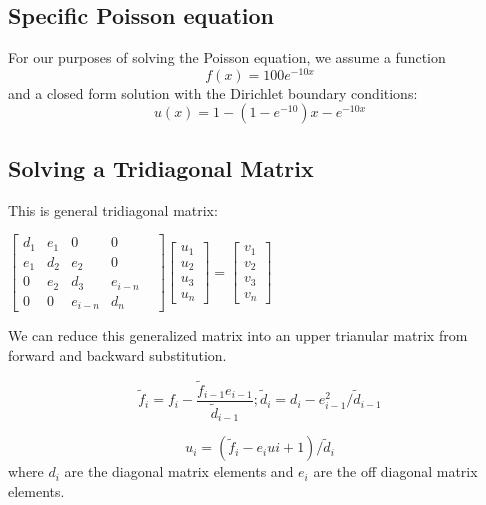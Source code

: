 \documentclass[10pt,showpacs,preprintnumbers,footinbib,amsmath,amssymb,aps,prl,twocolumn,groupedaddress,superscriptaddress,showkeys]{revtex4-1}
\begin{document}
	\subsection{Specific Poisson equation}	
For our purposes of solving the Poisson equation, we assume a function \begin{equation}
	f(x)=100e^{-10x}
	\end{equation}
and a closed form solution with the Dirichlet boundary conditions:
	\begin{equation}
	u(x)=1-(1-e^{-10})x-e^{-10x}
	\end{equation}

	\subsection{Solving a Tridiagonal Matrix}
This is general tridiagonal matrix:
	\begin{center}
		$\begin{bmatrix}
			d_{1}& e_{1} & 0 & 0 \\
			e_{1} & d_{2} & e_{2} & 0 & \\
			0 & e_{2} & d_{3} & e_{i-n}   \\
			0 & 0 & e_{i-n} & d_{n} 
	
		\end{bmatrix}
		 \begin{bmatrix}
			u_{1} \\
			u_{2} \\
			u_{3} \\
			u_{n} 
		\end{bmatrix} =
		\begin{bmatrix}
			v_{1} \\
			v_{2} \\
			v_{3} \\
			v_{n}
		\end{bmatrix}$
		\end{center}

We can reduce this generalized matrix into an upper trianular matrix from forward and backward substitution. 
	
	\begin{equation}
	\tilde{f}_{i}=f_{i}-\frac{\tilde{f}_{i-1}e_{i-1}}{\tilde{d}_{i-1}} ; \tilde{d}_{i}=d_{i}-e^{2}_{i-1}/\tilde{d}_{i-1}
	\label{forward}
	\end{equation}
	
	\begin{equation}
	u_{i} = (\tilde{f}_{i}-e_{i}u{i+1})/\tilde{d}_{i}
	\label{backward}
	\end{equation}
where $d_{i}$ are the diagonal matrix elements and $e_{i}$ are the off diagonal matrix elements.
\end{document}
